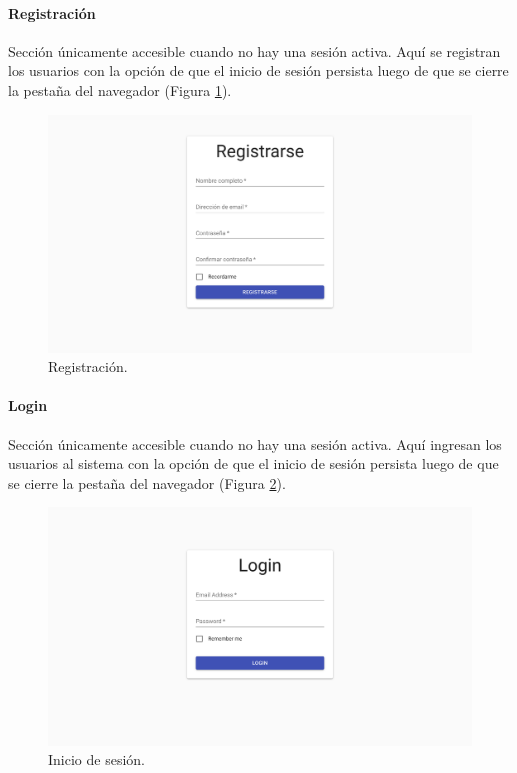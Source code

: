 \documentclass[12pt,a4paper,]{scrartcl}
\let\oldparagraph\paragraph
\renewcommand{\paragraph}[1]{\oldparagraph{#1}\mbox{}}
\begin{document}
\hypertarget{registraciuxf3n}{%
\paragraph{Registración}\label{registraciuxf3n}}

Sección únicamente accesible cuando no hay una sesión activa. Aquí se registran los usuarios con la opción de que el inicio de sesión persista luego de que se cierre la pestaña del navegador (Figura \ref{fig:logic-registration}).

\begin{figure}[H]

{\centering \includegraphics{assets/logic/register.pdf} 

}

\caption{Registración.}\label{fig:logic-registration}
\end{figure}

\hypertarget{login}{%
\paragraph{Login}\label{login}}

Sección únicamente accesible cuando no hay una sesión activa. Aquí ingresan los usuarios al sistema con la opción de que el inicio de sesión persista luego de que se cierre la pestaña del navegador (Figura \ref{fig:logic-login}).

\begin{figure}[H]

{\centering \includegraphics{assets/logic/login.pdf} 

}

\caption{Inicio de sesión.}\label{fig:logic-login}
\end{figure}
\end{document}
